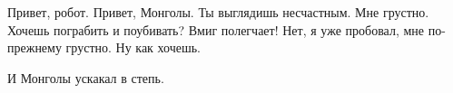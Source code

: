 \begin{dialog}
\X Привет, робот.
\R Привет, Монголы.
\X Ты выглядишь несчастным.
\R Мне грустно.
\X Хочешь пограбить и поубивать? Вмиг полегчает!
\R Нет, я уже пробовал, мне по-прежнему грустно.
\X Ну как хочешь.
\end{dialog}

\begin{monolog}
И Монголы ускакал в степь.
\end{monolog}
